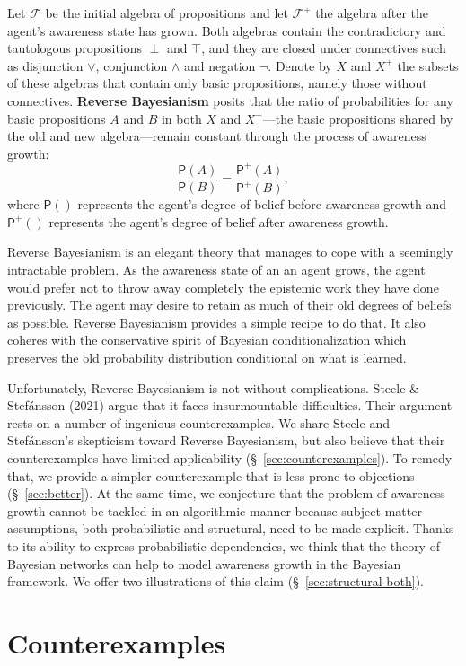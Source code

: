 \documentclass[
  11pt,
  dvipsnames,enabledeprecatedfontcommands]{scrartcl}
\newcommand{\pr}[1]{\ensuremath{\mathsf{P}(#1)}}
\newcommand{\ppr}[2]{\ensuremath{\mathsf{P}^{#1}(#2)}}
\begin{document}
Let \(\mathcal{F}\) be the initial algebra of propositions and let
\(\mathcal{F}^+\) the algebra after the agent's awareness state has
grown. Both algebras contain the contradictory and tautologous
propositions \(\perp\) and \(\top\), and they are closed under
connectives such as disjunction \(\vee\), conjunction \(\wedge\) and
negation \(\neg\). Denote by \(X\) and \(X^+\) the subsets of these
algebras that contain only basic propositions, namely those without
connectives. \textbf{Reverse Bayesianism} posits that the ratio of
probabilities for any basic propositions \(A\) and \(B\) in both \(X\)
and \(X^+\)---the basic propositions shared by the old and new
algebra---remain constant through the process of awareness growth:
\[\frac{\pr{A}}{\pr{B}} = \frac{\ppr{+}{A}}{\ppr{+}{B}},\] where
\(\pr{}\) represents the agent's degree of belief before awareness
growth and \(\ppr{+}{}\) represents the agent's degree of belief after
awareness growth.

Reverse Bayesianism is an elegant theory that manages to cope with a
seemingly intractable problem. As the awareness state of an an agent
grows, the agent would prefer not to throw away completely the epistemic
work they have done previously. The agent may desire to retain as much
of their old degrees of beliefs as possible. Reverse Bayesianism
provides a simple recipe to do that. It also coheres with the
conservative spirit of Bayesian conditionalization which preserves the
old probability distribution conditional on what is learned.

Unfortunately, Reverse Bayesianism is not without complications. Steele
\& Stefánsson (2021) argue that it faces insurmountable difficulties.
Their argument rests on a number of ingenious counterexamples. We share
Steele and Stefánsson's skepticism toward Reverse Bayesianism, but also
believe that their counterexamples have limited applicability
(\S ~\ref{sec:counterexamples}). To remedy that, we provide a simpler
counterexample that is less prone to objections (\S ~\ref{sec:better}).
At the same time, we conjecture that the problem of awareness growth
cannot be tackled in an algorithmic manner because subject-matter
assumptions, both probabilistic and structural, need to be made
explicit. Thanks to its ability to express probabilistic dependencies,
we think that the theory of Bayesian networks can help to model
awareness growth in the Bayesian framework. We offer two illustrations
of this claim (\S~\ref{sec:structural-both}).

\hypertarget{counterexamples}{%
\section{Counterexamples}\label{counterexamples}}
\end{document}
